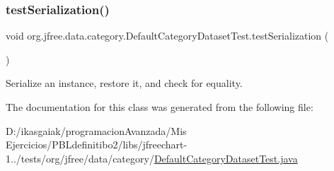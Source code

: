 \subsubsection{\texorpdfstring{test\+Serialization()}{testSerialization()}}
{\footnotesize\ttfamily void org.\+jfree.\+data.\+category.\+Default\+Category\+Dataset\+Test.\+test\+Serialization (\begin{DoxyParamCaption}{ }\end{DoxyParamCaption})}

Serialize an instance, restore it, and check for equality. 

The documentation for this class was generated from the following file\+:\begin{DoxyCompactItemize}
\item 
D\+:/ikasgaiak/programacion\+Avanzada/\+Mis Ejercicios/\+P\+B\+Ldefinitibo2/libs/jfreechart-\/1../tests/org/jfree/data/category/\mbox{\hyperlink{_default_category_dataset_test_8java}{Default\+Category\+Dataset\+Test.\+java}}\end{DoxyCompactItemize}
